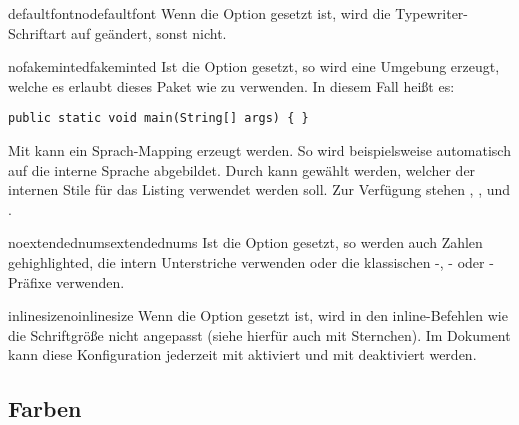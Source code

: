 \documentclass{sopra-base}
\begin{document}
    \begin{argument}{defaultfont}{nodefaultfont}
        Wenn die Option gesetzt ist, wird die Typewriter-Schriftart auf  geändert, sonst nicht.
    \end{argument}

    \begin{argument}{nofakeminted}{fakeminted}
        Ist die Option gesetzt, so wird eine  Umgebung erzeugt, welche es erlaubt dieses Paket wie  zu verwenden. In diesem Fall heißt es:
\begin{plainlatex}
\begin{verbatim}
public static void main(String[] args) { }
\end{verbatim}
\end{plainlatex}
        Mit  kann ein Sprach-Mapping erzeugt werden. So wird beispielsweise automatisch  auf die interne Sprache  abgebildet.
        Durch  kann gewählt werden, welcher der internen Stile für das Listing verwendet werden soll. Zur Verfügung stehen , ,  und .
    \end{argument}

    \begin{argument}{noextendednums}{extendednums}
        Ist die Option gesetzt, so werden auch Zahlen gehighlighted, die intern Unterstriche verwenden oder die klassischen -, - oder -Präfixe verwenden.
    \end{argument}

    \begin{argument}{inlinesize}{noinlinesize}
        Wenn die Option gesetzt ist, wird in den inline-Befehlen wie  die Schriftgröße nicht angepasst (siehe hierfür auch  mit Sternchen). Im Dokument kann diese Konfiguration jederzeit mit  aktiviert und mit  deaktiviert werden.
    \end{argument}
\subsection{Farben}
\end{document}

